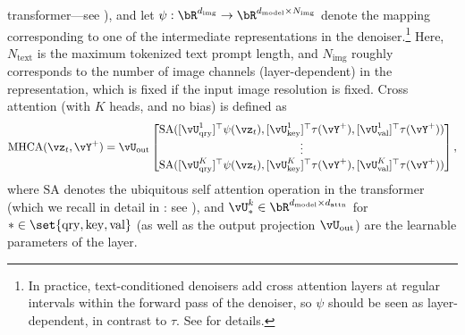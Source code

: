 \documentclass[../../book-main.tex]{subfiles}
\begin{document}
transformer---see ), and let $\psi : \bR^{d_{\mathrm{img}}}
\to \bR^{d_{\mathrm{model}} \times N_{\mathrm{img}}}$ denote the mapping corresponding to one of
the intermediate representations in the denoiser.\footnote{In practice,
text-conditioned denoisers add cross attention layers at regular intervals
within the forward pass of the denoiser, so $\psi$ should be seen as
layer-dependent, in contrast to $\tau$. See \textcite{rombach2022high} for
details.} Here, $N_{\mathrm{text}}$ is the maximum tokenized text prompt length,
and $N_{\mathrm{img}}$ roughly corresponds to the number of image channels
(layer-dependent) in the representation, which is fixed if the input image
resolution is fixed. Cross attention (with $K$ heads, and no bias) is defined as
    \begin{equation}
      \mathrm{MHCA}(\vz_t, \vY^+) \label{eq:mhca}
        = \vU_{\out}\mat{\SA([\vU_{\query}^{1}]^{\top}\psi(\vz_t),
        [\vU_{\key}^{1}]^{\top}\tau(\vY^+), [\vU_{\val}^{1}]^{\top}\tau(\vY^+)) \\ \vdots \\
        \SA([\vU_{\query}^{K}]^{\top}\psi(\vz_t),
        [\vU_{\key}^{K}]^{\top}\tau(\vY^+),
        [\vU_{\val}^{K}]^{\top}\tau(\vY^+))}, %
    \end{equation}
where $\mathrm{SA}$ denotes the ubiquitous self attention operation
in the transformer (which we recall in detail in : see
), and $\vU_{*}^{k} \in \bR^{d_{\mathrm{model}}\times
d_{\mathrm{attn}} }$ for $* \in \set{\mathrm{qry}, \mathrm{key}, \mathrm{val}}$
(as well as the output projection $\vU_{\mathrm{out}}$) are the learnable
parameters of the layer.
\end{document}
